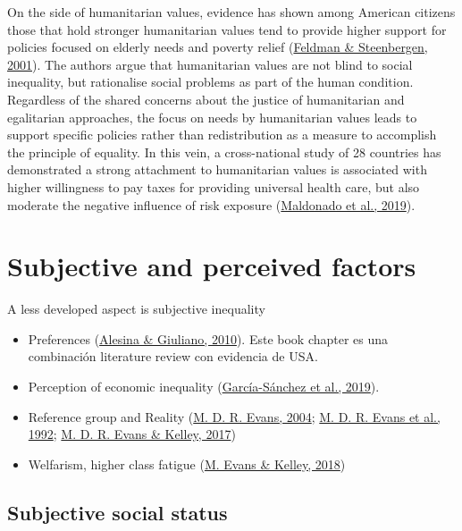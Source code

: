 \documentclass[
  12pt,
]{book}
\providecommand{\tightlist}{%
  \setlength{\itemsep}{0pt}\setlength{\parskip}{0pt}}
\begin{document}
On the side of humanitarian values, evidence has shown among American citizens those that hold stronger humanitarian values tend to provide higher support for policies focused on elderly needs and poverty relief (\protect\hyperlink{ref-feldman_humanitarian_2001}{Feldman \& Steenbergen, 2001}). The authors argue that humanitarian values are not blind to social inequality, but rationalise social problems as part of the human condition. Regardless of the shared concerns about the justice of humanitarian and egalitarian approaches, the focus on needs by humanitarian values leads to support specific policies rather than redistribution as a measure to accomplish the principle of equality. In this vein, a cross-national study of 28 countries has demonstrated a strong attachment to humanitarian values is associated with higher willingness to pay taxes for providing universal health care, but also moderate the negative influence of risk exposure (\protect\hyperlink{ref-Maldonadoetal2019}{Maldonado et al., 2019}).

\hypertarget{subjective-and-perceived-factors}{%
\chapter{Subjective and perceived factors}\label{subjective-and-perceived-factors}}

A less developed aspect is subjective inequality

\begin{itemize}
\tightlist
\item
  Preferences (\protect\hyperlink{ref-alesina_preferences_2010}{Alesina \& Giuliano, 2010}). Este book chapter es una combinación literature review con evidencia de USA.
\item
  Perception of economic inequality (\protect\hyperlink{ref-Garcia-Sanchez19}{García-Sánchez et al., 2019}).
\item
  Reference group and Reality (\protect\hyperlink{ref-Evans2004}{M. D. R. Evans, 2004}; \protect\hyperlink{ref-Evans1992}{M. D. R. Evans et al., 1992}; \protect\hyperlink{ref-Evans2017}{M. D. R. Evans \& Kelley, 2017})
\item
  Welfarism, higher class fatigue (\protect\hyperlink{ref-evans_strong_2018}{M. Evans \& Kelley, 2018})
\end{itemize}

\hypertarget{subjective-social-status}{%
\section{Subjective social status}\label{subjective-social-status}}
\end{document}
